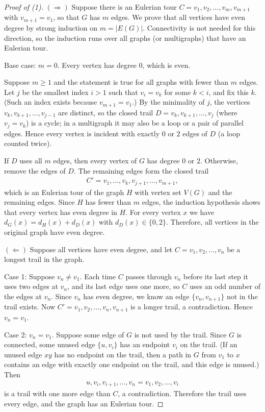 \documentclass{article}
\theoremstyle{definition}
\begin{document}
\begin{proof}[Proof of (1)]
$(\Rightarrow)$ Suppose there is an Eulerian tour $C = v_1, v_2, \ldots, v_m, v_{m+1}$ with $v_{m+1} = v_1$, so that $G$ has $m$ edges. We prove that all vertices have even degree by strong induction on $m = |E(G)|$. Connectivity is not needed for this direction, so the induction runs over all graphs (or multigraphs) that have an Eulerian tour.

Base case: $m = 0$. Every vertex has degree $0$, which is even.

Suppose $m \geq 1$ and the statement is true for all graphs with fewer than $m$ edges. Let $j$ be the smallest index $i > 1$ such that $v_i = v_k$ for some $k < i$, and fix this $k$. (Such an index exists because $v_{m+1} = v_1$.) By the minimality of $j$, the vertices $v_k, v_{k+1}, \ldots, v_{j-1}$ are distinct, so the closed trail $D = v_k, v_{k+1}, \ldots, v_j$ (where $v_j = v_k$) is a cycle; in a multigraph it may also be a loop or a pair of parallel edges. Hence every vertex is incident with exactly $0$ or $2$ edges of $D$ (a loop counted twice).

If $D$ uses all $m$ edges, then every vertex of $G$ has degree $0$ or $2$. Otherwise, remove the edges of $D$. The remaining edges form the closed trail
\begin{align*}
C' = v_1, \ldots, v_k, v_{j+1}, \ldots, v_{m+1},
\end{align*}
which is an Eulerian tour of the graph $H$ with vertex set $V(G)$ and the remaining edges. Since $H$ has fewer than $m$ edges, the induction hypothesis shows that every vertex has even degree in $H$. For every vertex $x$ we have $d_G(x) = d_H(x) + d_D(x)$ with $d_D(x) \in \{0, 2\}$. Therefore, all vertices in the original graph have even degree.

$(\Leftarrow)$ Suppose all vertices have even degree, and let $C = v_1, v_2, \ldots, v_n$ be a longest trail in the graph.

Case 1: Suppose $v_n \neq v_1$.
Each time $C$ passes through $v_n$ before its last step it uses two edges at $v_n$, and its last edge uses one more, so $C$ uses an odd number of the edges at $v_n$. Since $v_n$ has even degree, we know an edge $\{v_n, v_{n+1}\}$ not in the trail exists.
Now $C' = v_1, v_2, \ldots, v_n, v_{n+1}$ is a longer trail, a contradiction. Hence $v_n = v_1$.

Case 2: $v_n = v_1$.
Suppose some edge of $G$ is not used by the trail. Since $G$ is connected, some unused edge $\{u, v_i\}$ has an endpoint $v_i$ on the trail. (If an unused edge $xy$ has no endpoint on the trail, then a path in $G$ from $v_1$ to $x$ contains an edge with exactly one endpoint on the trail, and this edge is unused.)
Then
\begin{align*}
u, v_i, v_{i+1}, \ldots, v_n = v_1, v_2, \ldots, v_i
\end{align*}
is a trail with one more edge than $C$, a contradiction.
Therefore the trail uses every edge, and the graph has an Eulerian tour.
\end{proof}
\end{document}
